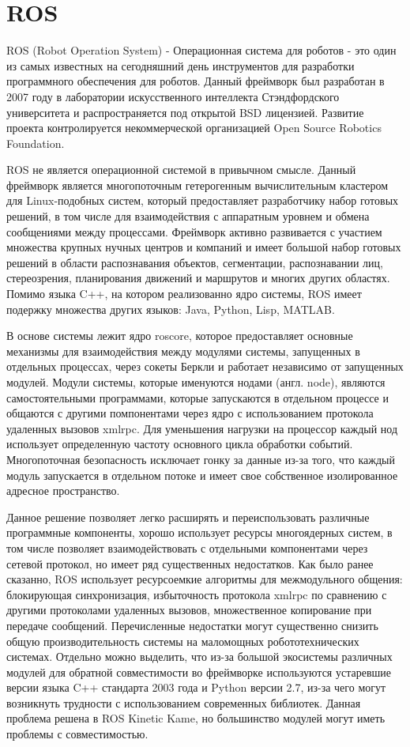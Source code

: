 \section{ROS}

ROS (Robot Operation System) - Операционная система для роботов - это один из самых известных на сегодняшний день инструментов для разработки программного обеспечения для роботов. Данный фреймворк был разработан в 2007 году в лаборатории искусственного интеллекта Стэндфордского университета и распространяется под открытой BSD лицензией. Развитие проекта контролируется некоммерческой организацией Open Source Robotics Foundation.

ROS не является операционной системой в привычном смысле. Данный фреймворк является многопоточным гетерогенным вычислительным кластером для Linux-подобных систем, который предоставляет разработчику набор готовых решений, в том числе для взаимодействия с аппаратным уровнем и обмена сообщениями между процессами. Фреймворк активно развивается \cite{boren2011exponential} с участием множества крупных нучных центров и компаний и имеет большой набор готовых решений в области распознавания объектов, сегментации, распознавании лиц, стереозрения, планирования движений и маршрутов и многих других областях. Помимо языка C++, на котором реализованно ядро системы, ROS имеет подержку множества других языков: Java, Python, Lisp, MATLAB.

В основе системы лежит ядро roscore, которое предоставляет основные механизмы для взаимодействия между модулями системы, запущенных в отдельных процессах, через сокеты Беркли и работает независимо от запущенных модулей. Модули системы, которые именуются нодами (англ. node),  являются самостоятельными программами, которые запускаются в отдельном процессе и общаются с другими помпонентами через ядро с использованием протокола удаленных вызовов xmlrpc. Для уменьшения нагрузки на процессор каждый нод использует определенную частоту основного цикла обработки событий. Многопоточная безопасность исключает гонку за данные из-за того, что каждый модуль запускается в отдельном потоке и имеет свое собственное изолированное адресное пространство.

Данное решение позволяет легко расширять и переиспользовать различные программные компоненты, хорошо использует ресурсы многоядерных систем, в том числе позволяет взаимодействовать с отдельными компонентами через сетевой протокол, но имеет ряд существенных недостатков. Как было ранее сказанно, ROS использует ресурсоемкие алгоритмы для межмодульного общения: блокирующая синхронизация, избыточность протокола xmlrpc по сравнению с другими протоколами удаленных вызовов, множественное копирование при передаче сообщений. Перечисленные недостатки могут существенно снизить общую производительность системы на маломощных робототехнических системах. Отдельно можно выделить, что из-за большой экосистемы различных модулей для обратной совместимости во фреймворке используются устаревшие версии языка C++ стандарта 2003 года и Python версии 2.7, из-за чего могут возникнуть трудности с использованием современных библиотек. Данная проблема решена в ROS Kinetic Kame, но большинство модулей могут иметь проблемы с совместимостью.


